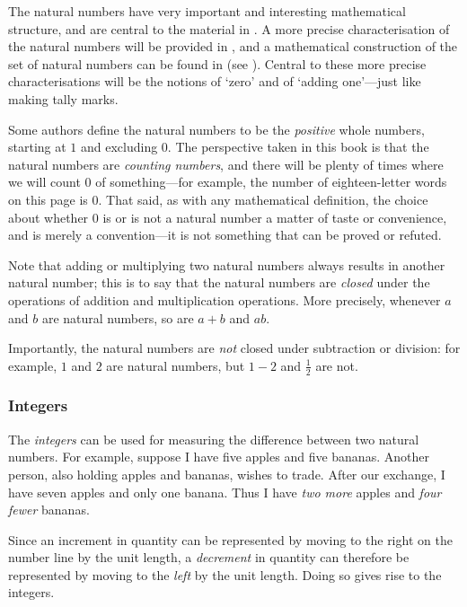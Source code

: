 The natural numbers have very important and interesting mathematical structure, and are central to the material in . A more precise characterisation of the natural numbers will be provided in , and a mathematical construction of the set of natural numbers can be found in  (see ). Central to these more precise characterisations will be the notions of `zero' and of `adding one'---just like making tally marks.

\begin{aside}
Some authors define the natural numbers to be the \textit{positive} whole numbers, starting at $1$ and excluding $0$. The perspective taken in this book is that the natural numbers are \textit{counting numbers}, and there will be plenty of times where we will count $0$ of something---for example, the number of eighteen-letter words on this page is $0$. That said, as with any mathematical definition, the choice about whether $0$ is or is not a natural number a matter of taste or convenience, and is merely a convention---it is not something that can be proved or refuted.
\end{aside}

Note that adding or multiplying two natural numbers always results in another natural number; this is to say that the natural numbers are \textit{closed} under the operations of addition and multiplication operations. More precisely, whenever $a$ and $b$ are natural numbers, so are $a+b$ and $ab$.

Importantly, the natural numbers are \textit{not} closed under subtraction or division: for example, $1$ and $2$ are natural numbers, but $1-2$ and $\frac{1}{2}$ are not.

\subsubsection*{Integers}

The \textit{integers} can be used for measuring the difference between two natural numbers. For example, suppose I have five apples and five bananas. Another person, also holding apples and bananas, wishes to trade. After our exchange, I have seven apples and only one banana. Thus I have \textit{two more} apples and \textit{four fewer} bananas.

Since an increment in quantity can be represented by moving to the right on the number line by the unit length, a \textit{decrement} in quantity can therefore be represented by moving to the \textit{left} by the unit length. Doing so gives rise to the integers.

